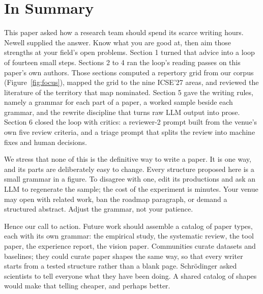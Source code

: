 \section{In Summary}
\label{sec:summary}

This paper asked how a research team should spend its scarce
writing hours.
Newell supplied the answer.
Know what you are good at, then aim those strengths at your
field's open problems.
Section 1 turned that advice into a loop of fourteen small
steps.
Sections 2 to 4 ran the loop's reading passes on this paper's
own authors.
Those sections computed a repertory grid from our corpus
(Figure~\ref{fig:focus}), mapped the grid to the nine ICSE'27
areas, and reviewed the literature of the territory that map
nominated.
Section 5 gave the writing rules, namely a grammar for each part
of a paper, a worked sample beside each grammar, and the rewrite
discipline that turns raw LLM output into prose.
Section 6 closed the loop with critics: a reviewer-2 prompt
built from the venue's own five review criteria, and a triage
prompt that splits the review into machine fixes and human
decisions.

We stress that none of this is the definitive way to write a
paper.
It is one way, and its parts are deliberately easy to change.
Every structure proposed here is a small grammar in a figure.
To disagree with one, edit its productions and ask an LLM to
regenerate the sample; the cost of the experiment is minutes.
Your venue may open with related work, ban the roadmap
paragraph, or demand a structured abstract.
Adjust the grammar, not your patience.

Hence our call to action.
Future work should assemble a catalog of paper types, each with
its own grammar: the empirical study, the systematic review, the
tool paper, the experience report, the vision paper.
Communities curate datasets and baselines; they could curate
paper shapes the same way, so that every writer starts from a
tested structure rather than a blank page.
Schr\"odinger asked scientists to tell everyone what they have
been doing.
A shared catalog of shapes would make that telling cheaper, and
perhaps better.

\appendix
